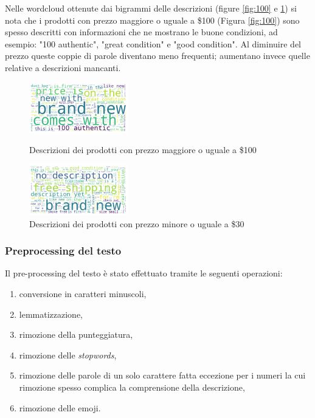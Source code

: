 \begin{itemize}
Nelle wordcloud ottenute dai bigrammi delle descrizioni (figure
\ref{fig:100} e \ref{Fig:minore_30}) si nota
che i prodotti con prezzo maggiore o uguale a \$100 (Figura \ref{fig:100}) sono
spesso descritti con informazioni che ne mostrano le buone condizioni, ad
esempio: "100 authentic", "great condition" e "good condition". Al diminuire del
prezzo queste coppie di parole diventano meno frequenti; aumentano invece quelle
relative a descrizioni mancanti.

\end{itemize}

\begin{figure}[H]
  \begin{minipage}{0.48\textwidth}
    \centering
    \includegraphics[height=2.2cm, keepaspectratio]{maggiore_100}
    \caption{Descrizioni dei prodotti con prezzo maggiore o uguale a \$100}
    \label{fig:100}
  \end{minipage}\hfill
  \begin{minipage}{0.48\textwidth}
    \centering
    \includegraphics[height=2.2cm, keepaspectratio]{minore_30}
    \caption{Descrizioni dei prodotti con prezzo minore o uguale a \$30}
    \label{Fig:minore_30}
  \end{minipage}
\end{figure}


\subsubsection{Preprocessing del testo}

Il pre-processing del testo è stato effettuato tramite le seguenti operazioni:
\begin{enumerate}
  \itemsep0em 
  \item conversione in caratteri minuscoli,
  \item lemmatizzazione,
  \item rimozione della punteggiatura,
  \item rimozione delle \textit{stopwords},
  \item rimozione delle parole di un solo carattere fatta eccezione per i
        numeri la cui rimozione spesso complica la comprensione della descrizione,
  \item rimozione delle emoji.
\end{enumerate}


